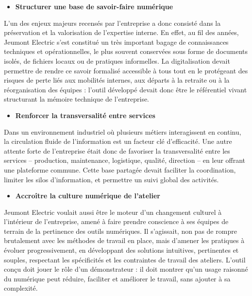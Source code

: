 \documentclass[11pt,a4paper]{article}
\begin{document}
\begin{itemize}
 \item \textbf{Structurer une base de savoir-faire numérique}
\end{itemize}
L’un des enjeux majeurs recensés par l’entreprise a donc consisté dans la préservation et la valorisation de l’expertise interne. En effet, au fil des années, Jeumont Electric s’est constitué un très important bagage de connaissances techniques et opérationnelles, le plus souvent conservées sous forme de documents isolés, de fichiers locaux ou de pratiques informelles. La digitalisation devait permettre de rendre ce savoir formalisé accessible à tous tout en le protégeant des risques de perte liés aux mobilités internes, aux départs à la retraite ou à la réorganisation des équipes : l’outil développé devait donc être le référentiel vivant structurant la mémoire technique de l’entreprise.
    
    
\begin{itemize}
   \item \textbf{Renforcer la transversalité entre services}
\end{itemize}
Dans un environnement industriel où plusieurs métiers interagissent en continu, la circulation fluide de l’information est un facteur clé d’efficacité. Une autre attente forte de l’entreprise était donc de favoriser la transversalité entre les services – production, maintenance, logistique, qualité, direction – en leur offrant une plateforme commune. Cette base partagée devait faciliter la coordination, limiter les silos d’information, et permettre un suivi global des activités.

\begin{itemize}
    \item \textbf{Accroître la culture numérique de l’atelier}
\end{itemize}
   Jeumont Electric voulait aussi être le moteur d’un changement culturel à l’intérieur de l’entreprise, amené à faire prendre conscience à ses équipes de terrain de la pertinence des outils numériques. Il s’agissait, non pas de rompre brutalement avec les méthodes de travail en place, mais d’amener les pratiques à évoluer progressivement, en développant des solutions intuitives, pertinentes et souples, respectant les spécificités et les contraintes de travail des ateliers. L’outil conçu doit jouer le rôle d’un démonstrateur : il doit montrer qu’un usage raisonné du numérique peut réduire, faciliter et améliorer le travail, sans ajouter à sa complexité.
\end{document}
